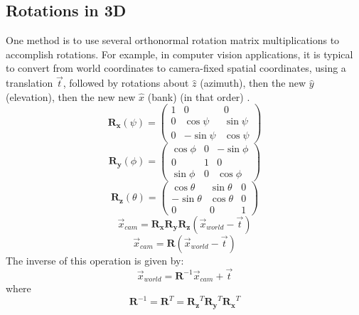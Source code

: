 \documentclass{amsart}
\begin{document}
\subsection{Rotations in 3D}
One method is to use several orthonormal rotation matrix multiplications to accomplish rotations. For example, in computer vision applications, it is typical to convert from world coordinates to camera-fixed spatial coordinates, using a translation $\vec{t}$, followed by rotations about $\hat{z}$ (azimuth), then the new $\hat{y}$ (elevation), then the new new $\hat{x}$ (bank) (in that order) \cite{Bradski:2008}. 
\begin{equation}
\mathbf{R_x}(\psi) =
\begin{pmatrix}
1 & 0 & 0 \\ 0 & \cos{\psi} & \sin{\psi} \\ 0 & -\sin{\psi} & \cos{\psi}
\end{pmatrix}
\end{equation}
\begin{equation}
\mathbf{R_y}(\phi) =
\begin{pmatrix}
\cos{\phi} & 0 & -\sin{\phi} \\
0 & 1 & 0 \\
\sin{\phi} & 0 & \cos{\phi}
\end{pmatrix}
\end{equation}
\begin{equation}
\mathbf{R_z}(\theta) = 
\begin{pmatrix}
\cos{\theta} & \sin{\theta} & 0 \\
-\sin{\theta} & \cos{\theta} & 0 \\
0 & 0 & 1
\end{pmatrix}
\end{equation}
\begin{equation}
\vec{x}_{cam} = 
\mathbf{R_x R_y R_z}
(\vec{x}_{world} - \vec{t})
\end{equation}
\begin{equation}
\vec{x}_{cam} = 
\mathbf{R}
(\vec{x}_{world} - \vec{t})
\end{equation}
The inverse of this operation is given by:
\begin{equation}
\vec{x}_{world}
=
\mathbf{R}^{-1} \vec{x}_{cam} + \vec{t} 
\end{equation}
where
\begin{equation}
\mathbf{R}^{-1} =
\mathbf{R}^T =
\mathbf{R_z}^T \mathbf{R_y}^T
\mathbf{R_x}^T
\end{equation}
\end{document}
